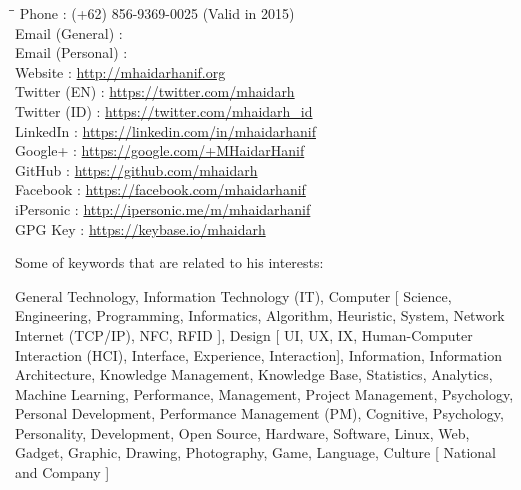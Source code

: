 \begin{tabbing}
\hspace*{3cm}\=\hspace*{0.5cm}\= \kill
Phone \>:\> (+62) 856-9369-0025 (Valid in 2015) \\
Email (General) \>:\> \myEmailGeneral \\
Email (Personal) \>:\> \myEmailPersonal \\
Website \>:\> \url{http://mhaidarhanif.org} \\
Twitter (EN) \>:\> \url{https://twitter.com/mhaidarh} \\
Twitter (ID) \>:\> \url{https://twitter.com/mhaidarh_id} \\
LinkedIn \>:\> \url{https://linkedin.com/in/mhaidarhanif} \\
Google+ \>:\> \url{https://google.com/+MHaidarHanif} \\
GitHub \>:\> \url{https://github.com/mhaidarh} \\
Facebook \>:\> \url{https://facebook.com/mhaidarhanif} \\
iPersonic \>:\> \url{http://ipersonic.me/m/mhaidarhanif} \\
GPG Key \>:\> \url{https://keybase.io/mhaidarh}
\end{tabbing}

\noindent Some of keywords that are related to his interests:

General Technology, Information Technology (IT), Computer [ Science, Engineering, Programming, Informatics, Algorithm, Heuristic, System, Network {Internet (TCP/IP), NFC, RFID} ], Design [ UI, UX, IX, Human-Computer Interaction (HCI), Interface, Experience, Interaction], Information, Information Architecture, Knowledge Management, Knowledge Base, Statistics, Analytics, Machine Learning, Performance, Management, Project Management, Psychology, Personal Development, Performance Management (PM), Cognitive, Psychology, Personality, Development, Open Source, Hardware, Software, Linux, Web, Gadget, Graphic, Drawing, Photography, Game, Language, Culture [ National and Company ]
